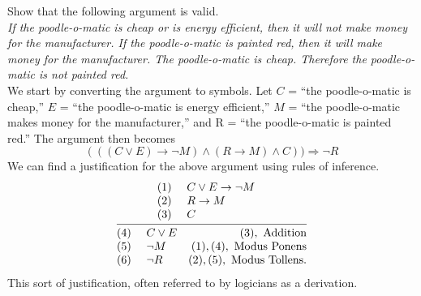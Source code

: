 \documentclass[]{article}
\begin{document}
\begin{exmp} Show that the following argument is valid.\\
\emph{If the poodle-o-matic is cheap or is energy efficient, then it will not make money for the manufacturer. If the poodle-o-matic is painted red, then it will make money for the manufacturer. The poodle-o-matic is cheap. Therefore the poodle-o-matic is not painted red.}\\
We start by converting the argument to symbols. Let $C$ = ``the poodle-o-matic is cheap,'' $E$ = ``the poodle-o-matic is energy efficient,'' $M$ = ``the poodle-o-matic makes money for the manufacturer,'' and R = ``the poodle-o-matic is painted red.'' The argument then becomes
\begin{equation}
		 (((C \vee E) \rightarrow \neg M) \wedge (R \rightarrow M) \wedge C)) \Rightarrow \neg R
\end{equation}
We can find a justification for the above argument using rules of inference.
\begin{equation}
\infer{\begin{array}{@{}llr@{}llr@{}llr@{}}(4)~&C \vee E& (3), \text{ Addition}\\(5)~ &\neg M&(1),(4), \text{ Modus Ponens}\\(6)~&\neg R&(2),(5), \text{ Modus Tollens}.\end{array}}{\begin{array}{@{}llr@{}llr@{}llr@{}} (1)~&C \vee E \rightarrow \neg M&\\(2)~&R \rightarrow M&\\(3)~&C&\end{array}}
\end{equation}
This sort of justification, often referred to by logicians as a derivation.
	\end{exmp}
\end{document}
